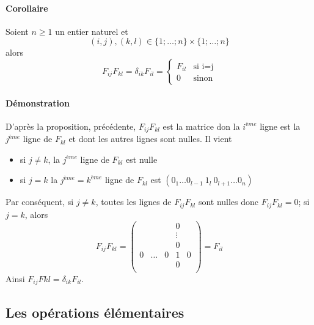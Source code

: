 \paragraph{Corollaire} Soient $n \geq 1$ un entier naturel et
$$(i, j), (k, l) \in \{1; \ldots; n\}\times\{1; \ldots; n\}$$
alors
$$F_{ij}F_{kl} = \delta_{ik} F_{il} = 
  \left\{\begin{array}{lr} F_{il} & \text{si i=j} \\ 0 & \text{sinon} \end{array} \right.$$

\paragraph{Démonstration} D'après la proposition, précédente, $F_{ij} F_{kl}$ est la matrice don la $i^{ème}$ ligne est la $j^{ème}$ ligne de $F_{kl}$ et dont les autres lignes sont nulles. Il vient
\begin{itemize}
  \item si $j\neq k$, la $j^{ème}$ ligne de $F_{kl}$ est nulle
  \item si $j = k$ la $j^{ème} = k^{ème}$ ligne de $F_{kl}$ est $(0_{1} \ldots 0_{l-1} ~ 1_{l} ~ 0_{l+1} \ldots 0_{n})$
\end{itemize}
Par conséquent, si $j\neq k$, toutes les lignes de $F_{ij} F_{kl}$ sont nulles donc $F_{ij} F_{kl} = 0$; si $j=k$, alors 
$$F_{ij} F_{kl} = \begin{pmatrix} 
  & & & 0 & \\
  & & & \vdots & \\
  & & & 0 & \\
  0 & \ldots & 0 & 1 & 0 \\
  & & & 0 & \\
\end{pmatrix} = F_{il}$$
Ainsi $F_{ij} F{kl} = \delta_{ik} F_{il}$.

%
\subsection{Les opérations élémentaires}
%
